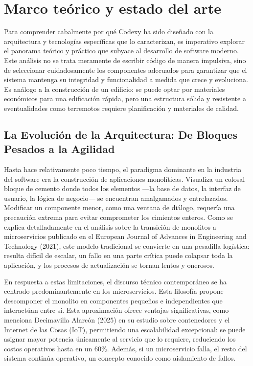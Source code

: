 \section{Marco teórico y estado del arte}

Para comprender cabalmente por qué Codexy ha sido diseñado con la arquitectura y tecnologías específicas que lo caracterizan, es imperativo explorar el panorama teórico y práctico que subyace al desarrollo de software moderno. Este análisis no se trata meramente de escribir código de manera impulsiva, sino de seleccionar cuidadosamente los componentes adecuados para garantizar que el sistema mantenga su integridad y funcionalidad a medida que crece y evoluciona. Es análogo a la construcción de un edificio: se puede optar por materiales económicos para una edificación rápida, pero una estructura sólida y resistente a eventualidades como terremotos requiere planificación y materiales de calidad.

\subsection{La Evolución de la Arquitectura: De Bloques Pesados a la Agilidad}

Hasta hace relativamente poco tiempo, el paradigma dominante en la industria del software era la construcción de aplicaciones monolíticas. Visualiza un colosal bloque de cemento donde todos los elementos —la base de datos, la interfaz de usuario, la lógica de negocio— se encuentran amalgamados y entrelazados. Modificar un componente menor, como una ventana de diálogo, requería una precaución extrema para evitar comprometer los cimientos enteros. Como se explica detalladamente en el análisis sobre la transición de monolitos a microservicios publicado en el European Journal of Advances in Engineering and Technology (2021), este modelo tradicional se convierte en una pesadilla logística: resulta difícil de escalar, un fallo en una parte crítica puede colapsar toda la aplicación, y los procesos de actualización se tornan lentos y onerosos.

En respuesta a estas limitaciones, el discurso técnico contemporáneo se ha centrado predominantemente en los microservicios. Esta filosofía propone descomponer el monolito en componentes pequeños e independientes que interactúan entre sí. Esta aproximación ofrece ventajas significativas, como menciona Decimavilla Alarcón (2025) en su estudio sobre contenedores y el Internet de las Cosas (IoT), permitiendo una escalabilidad excepcional: se puede asignar mayor potencia únicamente al servicio que lo requiere, reduciendo los costos operativos hasta en un 60\%. Además, si un microservicio falla, el resto del sistema continúa operativo, un concepto conocido como aislamiento de fallos.

